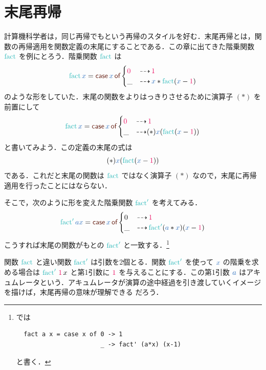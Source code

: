 \documentclass[a5paper,twoside,fleqn,draft]{jsbook}
\begin{document}
\section{末尾再帰}

計算機科学者は，同じ再帰でもという再帰のスタイルを好む．末尾再帰とは，関数の再帰適用を関数定義の末尾にすることである．この章に出てきた階乗関数 $\mFact$ を例にとろう．階乗関数 $\mFact$ は
\begin{equation}
  \mFact\hVar{x}
  =\hCaseSyntax{\hVar{x}}\begin{cases}
    \hConstant{0}
    &\hIfSo\hConstant{1}\\
    \_
    &\hIfSo\hVar{x}*\mFact(\hVar{x}-\hConstant{1})
  \end{cases}
\end{equation}
のような形をしていた．末尾の関数をよりはっきりさせるために演算子 $(*)$ を前置にして
\begin{equation}
  \mFact\hVar{x}
  =\hCaseSyntax{\hVar{x}}
  \begin{cases}
    \hConstant{0}
    &\hIfSo\hConstant{1}\\
    \_
    &\hIfSo(*)\hVar{x}(\mFact(\hVar{x}-\hConstant{1}))
  \end{cases}
\end{equation}
と書いてみよう．この定義の末尾の式は
\begin{equation}
  (*)\hVar{x}(\mFact(\hVar{x}-\hConstant{1}))
\end{equation}
である．これだと末尾の関数は $\mFact$ ではなく演算子 $(*)$ なので，末尾に再帰適用を行ったことにはならない．

そこで，次のように形を変えた階乗関数 $\mFFact$ を考えてみる．
\begin{equation}
  \mFFact\hVar{a}\hVar{x}
  =\hCaseSyntax{\hVar{x}}
  \begin{cases}
    0
    &\hIfSo\hConstant{1}\\
    \_
    &\hIfSo\mFFact(\hVar{a}*\hVar{x})(\hVar{x}-\hConstant{1})
  \end{cases}
\end{equation}
こうすれば末尾の関数がもとの $\mFFact$ と一致する．\footnote{\haskell では
\begin{verbatim}
  fact a x = case x of 0 -> 1
                       _ -> fact' (a*x) (x-1)
\end{verbatim}
と書く．}

関数 $\mFact$ と違い関数 $\mFFact$ は引数を2個とる．関数 $\mFFact$ を使って $\hVar{x}$ の階乗を求める場合は $\mFFact\,\hConstant{1}\,x$ と第1引数に $\hConstant{1}$ を与えることにする．この第1引数 $\hVar{a}$ はアキュムレータという．アキュムレータが演算の途中経過を引き渡していくイメージを描けば，末尾再帰の意味が理解できる
だろう．
\end{document}

